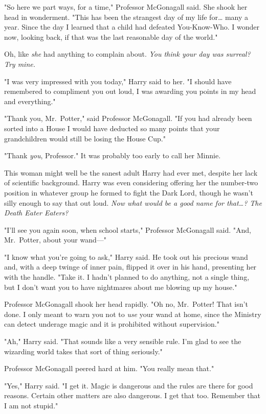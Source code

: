 "So here we part ways, for a time," Professor McGonagall said. She shook her
head in wonderment. "This has been the strangest day of my life for{\ldots}
many a year. Since the day I learned that a child had defeated You-Know-Who. I
wonder now, looking back, if that was the last reasonable day of the world."

Oh, like \emph{she} had anything to complain about. \emph{You think your day
was surreal? Try mine.}

"I was very impressed with you today," Harry said to her. "I should have
remembered to compliment you out loud, I was awarding you points in my head and
everything."

"Thank you, Mr.~Potter," said Professor McGonagall. "If you had already been
sorted into a House I would have deducted so many points that your
grandchildren would still be losing the House Cup."

"Thank \emph{you}, Professor." It was probably too early to call her Minnie.

This woman might well be the sanest adult Harry had ever met, despite her lack
of scientific background. Harry was even considering offering her the
number-two position in whatever group he formed to fight the Dark Lord, though
he wasn't silly enough to say that out loud. \emph{Now what would be a good
name for that{\ldots}? The Death Eater Eaters?}

"I'll see you again soon, when school starts," Professor McGonagall said. "And,
Mr.~Potter, about your wand---"

"I know what you're going to ask," Harry said. He took out his precious wand
and, with a deep twinge of inner pain, flipped it over in his hand, presenting
her with the handle. "Take it. I hadn't planned to do anything, not a single
thing, but I don't want you to have nightmares about me blowing up my house."

Professor McGonagall shook her head rapidly. "Oh no, Mr.~Potter! That isn't
done. I only meant to warn you not to \emph{use} your wand at home, since the
Ministry can detect underage magic and it is prohibited without supervision."

"Ah," Harry said. "That sounds like a very sensible rule. I'm glad to see the
wizarding world takes that sort of thing seriously."

Professor McGonagall peered hard at him. "You really mean that."

"Yes," Harry said. "I get it. Magic is dangerous and the rules are there for
good reasons. Certain other matters are also dangerous. I get that too.
Remember that I am not stupid."

